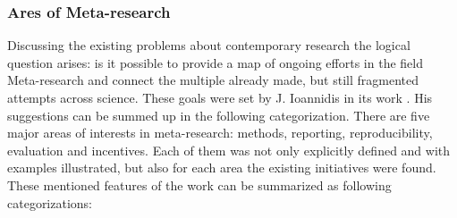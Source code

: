 		\subsubsection{Ares of Meta-research}
		Discussing the existing problems about contemporary research the logical question arises: is it possible to provide a map of ongoing efforts in the field Meta-research and connect the multiple already made, but still fragmented attempts across science. These goals were set by J. Ioannidis in its work \frqq \cite{Ioa15}. \newline
		His suggestions can be summed up in the following categorization. There are five major areas of interests in meta-research: methods, reporting, reproducibility, evaluation and incentives. Each of them was not only explicitly defined and with examples illustrated, but also for each area the existing initiatives were found. These mentioned features of the work can be summarized as following categorizations:  
